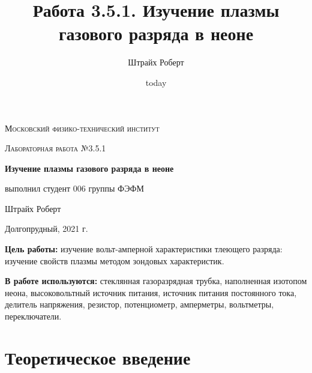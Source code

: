 \documentclass[a4paper, 12pt]{article}
\author{Штрайх Роберт}
\title{Работа 3.5.1. Изучение плазмы газового разряда в неоне}
\date{today}
\begin{document}
\begin{titlepage}
	\centering
	\vspace{5cm}
	{\scshape\LARGE Московский физико-технический институт \par}
	\vspace{4cm}
	{\scshape\Large Лабораторная работа №3.5.1 \par}
	\vspace{1cm}
	{\huge\bfseries Изучение плазмы газового разряда в неоне\par}
	\vspace{1cm}
	\vfill
\begin{flushright}
	{\Large выполнил студент 006 группы ФЭФМ}\par
	\vspace{0.3cm}
	{\Large Штрайх Роберт}
\end{flushright}
	

	\vfill

	Долгопрудный, 2021 г.
\end{titlepage}

\newpage

\textbf{Цель работы:} изучение вольт-амперной характеристики тлеющего разряда: изучение свойств плазмы методом зондовых характеристик.

\textbf{В работе используются:} стеклянная газоразрядная трубка, наполненная изотопом неона, высоковольтный источник питания, источник питания постоянного тока, делитель напряжения, резистор, потенциометр, амперметры, вольтметры, переключатели.

\section{Теоретическое введение}
\end{document}
